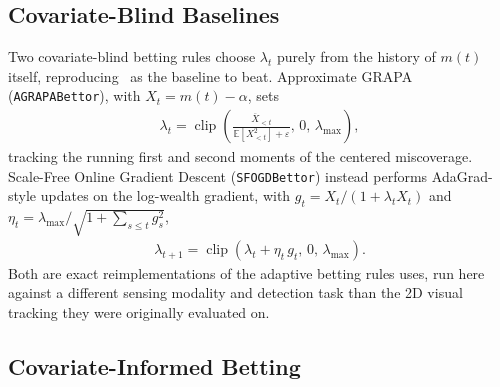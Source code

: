 \subsection{Covariate-Blind Baselines}
\label{sec:blind}

Two covariate-blind betting rules choose $\lambda_t$ purely from the history of $m(t)$ itself, reproducing~\cite{MonroyMunoz2026WACV} as the baseline to beat. Approximate GRAPA (\texttt{AGRAPABettor}), with $X_t = m(t) - \alpha$, sets
\begin{align*}
\lambda_t = \operatorname{clip}\!\left(\frac{\overline{X}_{<t}}{\mathbb{E}[X_{<t}^2] + \varepsilon}, \, 0, \, \lambda_{\max}\right),
\end{align*}
tracking the running first and second moments of the centered miscoverage. Scale-Free Online Gradient Descent (\texttt{SFOGDBettor}) instead performs AdaGrad-style updates on the log-wealth gradient, with $g_t = X_t / (1 + \lambda_t X_t)$ and $\eta_t = \lambda_{\max} / \sqrt{1 + \sum_{s \le t} g_s^2}$,
\begin{align*}
\lambda_{t+1} = \operatorname{clip}\!\left(\lambda_t + \eta_t \, g_t, \, 0, \, \lambda_{\max}\right).
\end{align*}
Both are exact reimplementations of the adaptive betting rules \cite{MonroyMunoz2026WACV} uses, run here against a different sensing modality and detection task than the 2D visual tracking they were originally evaluated on.

\subsection{Covariate-Informed Betting}
\label{sec:informed}

